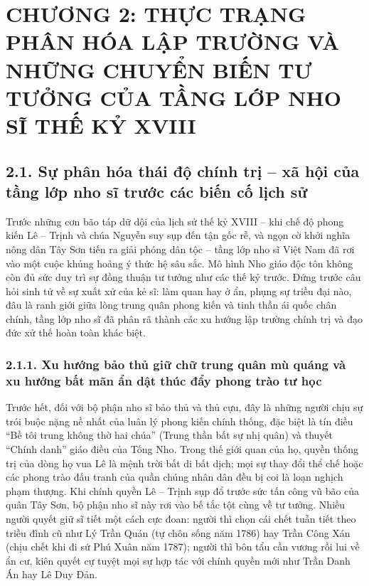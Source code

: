 \section*{CHƯƠNG 2: THỰC TRẠNG PHÂN HÓA LẬP TRƯỜNG VÀ NHỮNG CHUYỂN BIẾN TƯ TƯỞNG CỦA TẦNG LỚP NHO SĨ THẾ KỶ XVIII}

\subsection*{2.1. Sự phân hóa thái độ chính trị -- xã hội của tầng lớp nho sĩ trước các biến cố lịch sử}

Trước những cơn bão táp dữ dội của lịch sử thế kỷ XVIII -- khi chế độ phong kiến Lê -- Trịnh và chúa Nguyễn suy sụp đến tận gốc rễ, và ngọn cờ khởi nghĩa nông dân Tây Sơn tiến ra giải phóng dân tộc -- tầng lớp nho sĩ Việt Nam đã rơi vào một cuộc khủng hoảng ý thức hệ sâu sắc. Mô hình Nho giáo độc tôn không còn đủ sức duy trì sự đồng thuận tư tưởng như các thế kỷ trước. Đứng trước câu hỏi sinh tử về sự xuất xử của kẻ sĩ: làm quan hay ở ẩn, phụng sự triều đại nào, đâu là ranh giới giữa lòng trung quân phong kiến và tinh thần ái quốc chân chính, tầng lớp nho sĩ đã phân rã thành các xu hướng lập trường chính trị và đạo đức xử thế hoàn toàn khác biệt.

\subsubsection*{2.1.1. Xu hướng bảo thủ giữ chữ trung quân mù quáng và xu hướng bất mãn ẩn dật thúc đẩy phong trào tư học}

Trước hết, đối với bộ phận nho sĩ bảo thủ và thủ cựu, đây là những người chịu sự trói buộc nặng nề nhất của luân lý phong kiến chính thống, đặc biệt là tín điều ``Bề tôi trung không thờ hai chúa'' (Trung thần bất sự nhị quân) và thuyết ``Chính danh'' giáo điều của Tống Nho. Trong thế giới quan của họ, quyền thống trị của dòng họ vua Lê là mệnh trời bất di bất dịch; mọi sự thay đổi thể chế hoặc các phong trào đấu tranh của quần chúng nhân dân đều bị coi là loạn nghịch phạm thượng. Khi chính quyền Lê -- Trịnh sụp đổ trước sức tấn công vũ bão của quân Tây Sơn, bộ phận nho sĩ này rơi vào bế tắc tột cùng về tư tưởng. Nhiều người quyết giữ sĩ tiết một cách cực đoan: người thì chọn cái chết tuẫn tiết theo triều đình cũ như Lý Trần Quán (tự chôn sống năm 1786) hay Trần Công Xán (chịu chết khi đi sứ Phú Xuân năm 1787); người thì bôn tẩu cần vương rồi lui về ẩn cư, kiên quyết cự tuyệt mọi sự hợp tác với chính quyền mới như Trần Danh Án hay Lê Duy Đản.

